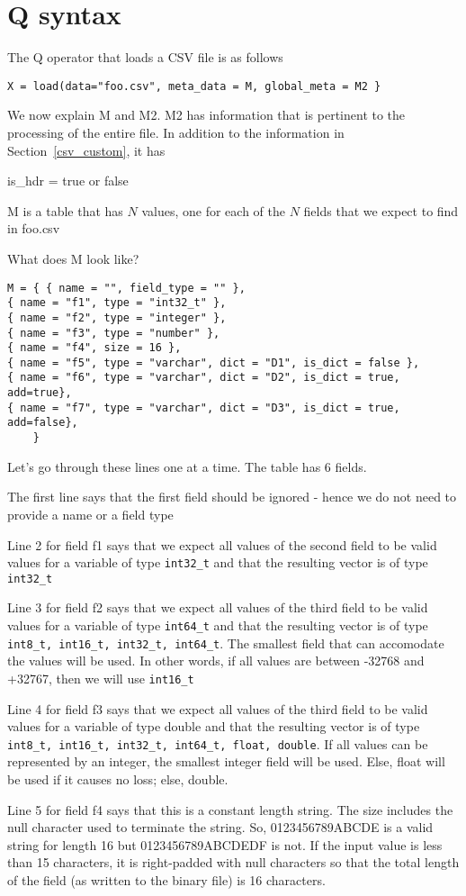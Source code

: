 \documentclass[letterpaper]{article}
\begin{document}
\section{Q syntax}
The Q operator that loads a CSV file is as follows
\begin{verbatim}
X = load(data="foo.csv", meta_data = M, global_meta = M2 }
\end{verbatim}

We now explain M and M2. M2 has information that is pertinent to the processing
of the entire file. In addition to the information in Section~\ref{csv_custom},
it has 
\be
\item is\_hdr = true or false
\ee

M is a table that has \(N\) values, one for each of the \(N\) fields
that we expect to find in foo.csv

What does M look like?
\begin{verbatim}
M = { { name = "", field_type = "" },
{ name = "f1", type = "int32_t" },
{ name = "f2", type = "integer" },
{ name = "f3", type = "number" },
{ name = "f4", size = 16 },
{ name = "f5", type = "varchar", dict = "D1", is_dict = false }, 
{ name = "f6", type = "varchar", dict = "D2", is_dict = true, add=true},
{ name = "f7", type = "varchar", dict = "D3", is_dict = true, add=false},
    }
\end{verbatim}

Let's go through these lines one at a time. The table has 6 fields.

\be
\item 
The first line says that the first field should be ignored - hence we
do not need to provide a name or a field type
\item 
Line 2 for field f1 says that we expect all values of the second field to
be valid values for a variable of type \verb+int32_t+ and that the
resulting vector is of type \verb+int32_t+

\item 
Line 3 for field f2  says that we expect all values of the third field to
be valid values for a variable of type \verb+int64_t+ and that the
resulting vector is of type
\verb+int8_t, int16_t, int32_t, int64_t+. The smallest field that
can accomodate the values will be used. In other words, if all values are
between -32768 and +32767, then we will use \verb+int16_t+
\item 
Line 4 for field f3 says that we expect all values of the third field to
be valid values for a variable of type double and that the resulting
vector is of type
\verb+int8_t, int16_t, int32_t, int64_t, float, double+. If all values
can be represented by an integer, the smallest integer field will be
used. Else, float will be used if it causes no loss; else, double.
\item Line 5 for field f4 says that this is a constant length string. The size
  includes the null character used to terminate the string. So, 0123456789ABCDE
  is a valid string for length 16 but 0123456789ABCDEDF is not. If the input
  value is less than 15 characters, it is right-padded with null characters so that
  the total length of the field (as written to the binary file) is 16
  characters. 
\end{document}

